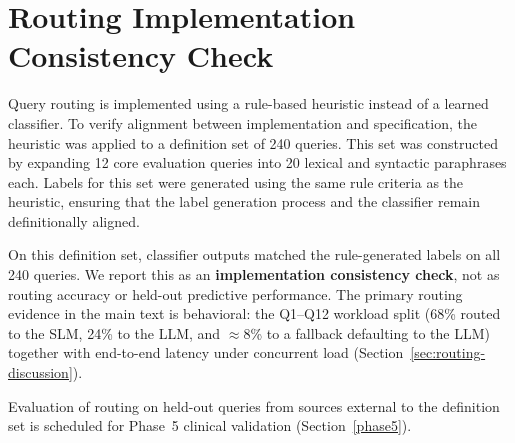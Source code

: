 \appendices
\section{Routing Implementation Consistency Check}
\label{app:routing-consistency}

Query routing is implemented using a rule-based heuristic instead of a learned classifier. To verify alignment between implementation and specification, the heuristic was applied to a definition set of 240 queries. This set was constructed by expanding 12 core evaluation queries into 20 lexical and syntactic paraphrases each. Labels for this set were generated using the same rule criteria as the heuristic, ensuring that the label generation process and the classifier remain definitionally aligned.

On this definition set, classifier outputs matched the rule-generated labels on all 240 queries. We report this as an \textbf{implementation consistency check}, not as routing accuracy or held-out predictive performance. The primary routing evidence in the main text is behavioral: the Q1--Q12 workload split (68\% routed to the SLM, 24\% to the LLM, and $\approx$8\% to a fallback defaulting to the LLM) together with end-to-end latency under concurrent load (Section~\ref{sec:routing-discussion}).

Evaluation of routing on held-out queries from sources external to the definition set is scheduled for Phase~5 clinical validation (Section~\ref{phase5}).
